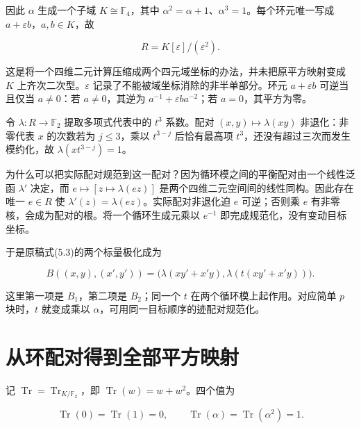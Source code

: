 \documentclass[UTF8,fontset=fandol,zihao=-4,openany,oneside]{ctexbook}
\begin{document}
因此 \(\alpha\) 生成一个子域 \(K\cong\mathbb F_4\)，其中 \(\alpha^2=\alpha+1\)、\(\alpha^3=1\)。每个环元唯一写成 \(a+\varepsilon b\)，\(a,b\in K\)，故



\[
R=K[\varepsilon]/(\varepsilon^2).
\]



这是将一个四维二元计算压缩成两个四元域坐标的办法，并未把原平方映射变成 \(K\) 上齐次二次型。\(\varepsilon\) 记录了不能被域坐标消除的非半单部分。环元 \(a+\varepsilon b\) 可逆当且仅当 \(a\ne0\)：若 \(a\ne0\)，其逆为 \(a^{-1}+\varepsilon b a^{-2}\)；若 \(a=0\)，其平方为零。



令 \(\lambda:R\to\mathbb F_2\) 提取多项式代表中的 \(t^3\) 系数。配对 \((x,y)\mapsto\lambda(xy)\) 非退化：非零代表 \(x\) 的次数若为 \(j\le3\)，乘以 \(t^{3-j}\) 后恰有最高项 \(t^3\)，还没有超过三次而发生模约化，故 \(\lambda(xt^{3-j})=1\)。



为什么可以把实际配对规范到这一配对？因为循环模之间的平衡配对由一个线性泛函 \(\lambda'\) 决定，而 \(e\mapsto[z\mapsto\lambda(ez)]\) 是两个四维二元空间间的线性同构。因此存在唯一 \(e\in R\) 使 \(\lambda'(z)=\lambda(ez)\)。实际配对非退化迫 \(e\) 可逆；否则乘 \(e\) 有非零核，会成为配对的根。将一个循环生成元乘以 \(e^{-1}\) 即完成规范化，没有变动目标坐标。



于是原稿式(5.3)的两个标量极化成为



\[
B((x,y),(x',y'))=
\bigl(\lambda(xy'+x'y),\lambda(t(xy'+x'y))\bigr).
\]



这里第一项是 \(B_1\)，第二项是 \(B_2\)；同一个 \(t\) 在两个循环模上起作用。对应简单 \(p\) 块时，\(t\) 就变成乘以 \(\alpha\)，可用同一目标顺序的迹配对规范化。



\section{从环配对得到全部平方映射}


记 \(\operatorname{Tr}=\operatorname{Tr}_{K/\mathbb F_2}\)，即 \(\operatorname{Tr}(w)=w+w^2\)。四个值为



\[
\operatorname{Tr}(0)=\operatorname{Tr}(1)=0,
\qquad \operatorname{Tr}(\alpha)=\operatorname{Tr}(\alpha^2)=1.
\]
\end{document}
